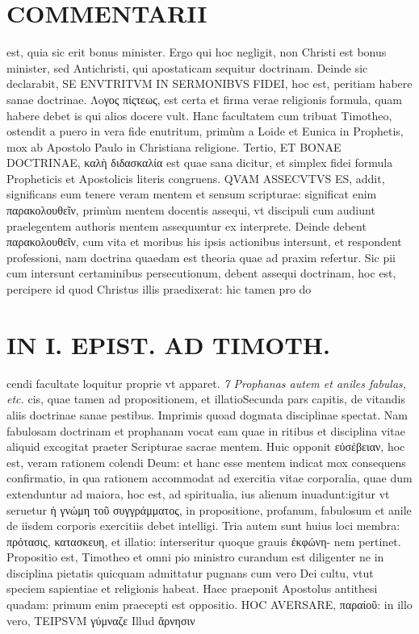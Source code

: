 \documentclass{article}
\begin{document}
\begin{pages}
\section*{COMMENTARII }
\marginpar{[ p.94 ]}\pstart est, quia sic erit bonus minister. Ergo qui hoc negligit, non Christi est bonus minister, sed Antichristi, qui apostaticam sequitur doctrinam. Deinde sic declarabit, SE ENVTRITVM IN SERMONIBVS FIDEI, hoc est, peritiam habere sanae doctrinae. Λoγος πίςτεως, est certa et firma verae religionis formula, quam habere debet is qui alios docere vult. Hanc facultatem cum tribuat Timotheo, ostendit a puero in vera fide enutritum, primùm a Loide et Eunica in Prophetis, mox ab Apostolo Paulo in Christiana religione.  \pend\pstart Tertio, ET BONAE DOCTRINAE, καλὴ διδασκαλία est quae sana dicitur, et simplex fidei formula Propheticis et Apostolicis literis congruens. QVAM ASSECVTVS ES, addit, significans eum tenere veram mentem et sensum scripturae: significat enim παρακολουθεῖν, primùm mentem docentis assequi, vt discipuli cum audiunt praelegentem authoris mentem assequuntur ex interprete. Deinde debent παρακολουθεῖν, cum vita et moribus  his ipsis actionibus intersunt, et respondent professioni, nam doctrina quaedam est theoria quae ad praxim refertur. Sic pii cum intersunt certaminibus persecutionum, debent assequi doctrinam, hoc est, percipere id quod Christus illis praedixerat: hic tamen pro do\pend
\section*{IN I. EPIST. AD TIMOTH. }
\marginpar{[ p.95 ]}\pstart cendi facultate loquitur proprie vt apparet.  \pend
\textit{7 Prophanas autem et aniles fabulas, etc. }\pstart cis, quae tamen ad propositionem, et illatioSecunda pars capitis, de vitandis aliis doctrinae sanae pestibus. Imprimis quoad dogmata disciplinae spectat. Nam fabulosam doctrinam et prophanam vocat eam quae in ritibus et disciplina vitae aliquid excogitat praeter Scripturae sacrae mentem. Huic opponit εὐσέβειαν, hoc est, veram rationem colendi Deum: et hanc esse mentem indicat mox consequens confirmatio, in qua rationem accommodat ad exercitia vitae corporalia, quae dum extenduntur ad maiora, hoc est, ad spiritualia, ius alienum inuadunt:igitur vt seruetur ἡ γνώμη τοῦ συγγράμματος, in propositione, profanum, fabulosum et anile de iisdem corporis exercitiis debet intelligi. Tria autem sunt huius loci membra: πρότασις, κατασκευη, et illatio: interseritur quoque grauis ἐκφώνη- nem pertinet.  \pend\pstart Propositio est, Timotheo et omni pio ministro curandum est diligenter ne in disciplina pietatis quicquam admittatur pugnans cum vero Dei cultu, vtut speciem sapientiae et religionis habeat. Haec praeponit Apostolus antithesi quadam: primum enim praecepti est oppositio. HOC AVERSARE, παραίοῦ: in illo vero, TEIPSVM γύμναζε Illud ἄρνησιν  \pend

\end{pages}
\end{document}
